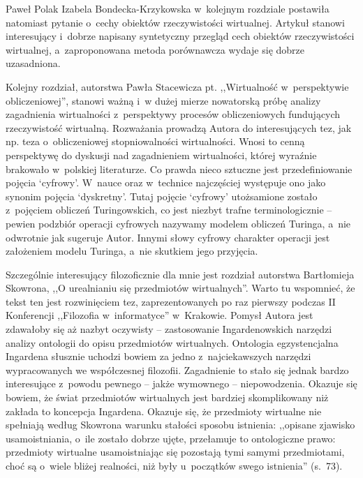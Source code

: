 \begin{recplenv}{Paweł Polak}
Izabela Bondecka-Krzykowska w~kolejnym rozdziale postawiła natomiast pytanie o~cechy obiektów rzeczywistości wirtualnej. Artykuł stanowi interesujący i~dobrze napisany syntetyczny przegląd cech obiektów rzeczywistości wirtualnej, a~zaproponowana metoda porównawcza wydaje się dobrze uzasadniona.

Kolejny rozdział, autorstwa Pawła Stacewicza pt. ,,Wirtualność w~perspektywie obliczeniowej'', stanowi ważną i~w dużej mierze nowatorską próbę analizy zagadnienia wirtualności z~perspektywy procesów obliczeniowych fundujących rzeczywistość wirtualną. Rozważania prowadzą Autora do interesujących tez, jak np. teza o~obliczeniowej stopniowalności wirtualności. Wnosi to cenną perspektywę do dyskusji nad zagadnieniem wirtualności, której wyraźnie brakowało w~polskiej literaturze. Co prawda nieco sztuczne jest przedefiniowanie pojęcia ‘cyfrowy'. W~nauce oraz w~technice najczęściej występuje ono jako synonim pojęcia ‘dyskretny'. Tutaj pojęcie ‘cyfrowy' utożsamione zostało z~pojęciem obliczeń Turingowskich, co jest niezbyt trafne terminologicznie -- pewien podzbiór operacji cyfrowych nazywamy modelem obliczeń Turinga, a~nie odwrotnie jak sugeruje Autor. Innymi słowy cyfrowy charakter operacji jest założeniem modelu Turinga, a~nie skutkiem jego przyjęcia.

Szczególnie interesujący filozoficznie dla mnie jest rozdział autorstwa Bartłomieja Skowrona, ,,O urealnianiu się przedmiotów wirtualnych''. Warto tu wspomnieć, że tekst ten jest rozwinięciem tez, zaprezentowanych po raz pierwszy podczas II Konferencji ,,Filozofia w~informatyce'' w~Krakowie. Pomysł Autora jest zdawałoby się aż nazbyt oczywisty -- zastosowanie Ingardenowskich narzędzi analizy ontologii do opisu przedmiotów wirtualnych. Ontologia egzystencjalna Ingardena słusznie uchodzi bowiem za jedno z~najciekawszych narzędzi wypracowanych we współczesnej filozofii. Zagadnienie to stało się jednak bardzo interesujące z~powodu pewnego -- jakże wymownego -- niepowodzenia. Okazuje się bowiem, że świat przedmiotów wirtualnych jest bardziej skomplikowany niż zakłada to koncepcja Ingardena. Okazuje się, że przedmioty wirtualne nie spełniają według Skowrona warunku stałości sposobu istnienia: ,,opisane zjawisko usamoistniania, o~ile zostało dobrze ujęte, przełamuje to ontologiczne prawo: przedmioty wirtualne usamoistniając się pozostają tymi samymi przedmiotami, choć są o~wiele bliżej realności, niż były u~początków swego istnienia'' (s.~73).


\end{recplenv}
